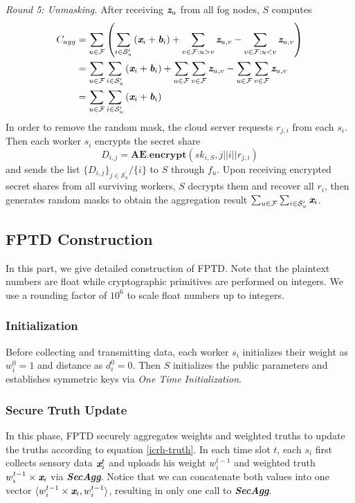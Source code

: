\documentclass[conference,a4paper]{IEEEtran}
\def\textbi#1{\textbf{\em #1}}
\begin{document}
    {\em Round 5: Unmasking.}
    After receiving $\textbi{z}_u$ from all fog nodes, $S$ computes
    \begin{equation}\nonumber
    \begin{aligned}
      C_{agg}&=\sum_{u\in \mathcal{F}} \left(\sum_{i\in \mathcal{S}_u^\prime} \left(\textbi{x}_i+\textbi{b}_i\right)+\sum_{v\in \mathcal{F}:u>v} \textbi{z}_{u,v}-\sum_{v\in \mathcal{F}:u<v} \textbi{z}_{u,v}\right)\\
             &=\sum_{u\in \mathcal{F}} \sum_{i\in \mathcal{S}_u^\prime} \left(\textbi{x}_i+\textbi{b}_i\right)+\sum_{u\in \mathcal{F}}\sum_{v\in\mathcal{F}} \textbi{z}_{u,v}-\sum_{u\in \mathcal{F}}\sum_{v\in\mathcal{F}} \textbi{z}_{u,v}\\
             &=\sum_{u\in \mathcal{F}} \sum_{i\in \mathcal{S}_u^\prime} \left(\textbi{x}_i+\textbi{b}_i\right)
    \end{aligned}
    \end{equation}
    In order to remove the random mask, the cloud server requests $r_{j,i}$ from each $s_i$. Then each worker $s_i$ encrypts the secret share
    \begin{equation}\nonumber
      D_{i,j}=\textbf{AE.encrypt}(sk_{i,S},j||i||r_{j,i})
    \end{equation}
    and sends the list $\{D_{i,j}\}_{j\in \mathcal{S}_u^\prime}/\{i\}$ to $S$ through $f_u$. Upon receiving encrypted secret shares from all surviving workers, $S$ decrypts them and recover all $r_i$, then generates random masks to obtain the aggregation result $\sum_{u\in \mathcal{F}} \sum_{i\in \mathcal{S}_u^\prime} \textbi{x}_i$.
\addtolength{\leftmargin}{0.584cm}

    \subsection{FPTD Construction}
    In this part, we give detailed construction of FPTD. Note that the plaintext numbers are float while cryptographic primitives are performed on integers. We use a rounding factor of $10^6$ to scale float numbers up to integers.
        \subsubsection{Initialization}
        Before collecting and transmitting data, each worker $s_i$ initializes their weight as $w_i^0=1$ and distance as $d_i^0=0$. Then $S$ initializes the public parameters and establishes symmetric keys via {\em One Time Initialization}.
        \subsubsection{Secure Truth Update}
        In this phase, FPTD securely aggregates weights and weighted truths to update the truths according to equation \ref{icrh-truth}. In each time slot $t$, each $s_i$ first collects sensory data $\textbi{x}_i^t$ and uploads his weight $w_i^{t-1}$ and weighted truth $w_i^{t-1}\times \textbi{x}_i$ via \textbi{SecAgg}. Notice that we can concatenate both values into one vector $\langle w_i^{t-1}\times \textbi{x}_i,w_i^{t-1}\rangle$, resulting in only one call to \textbi{SecAgg}.
\end{document}
